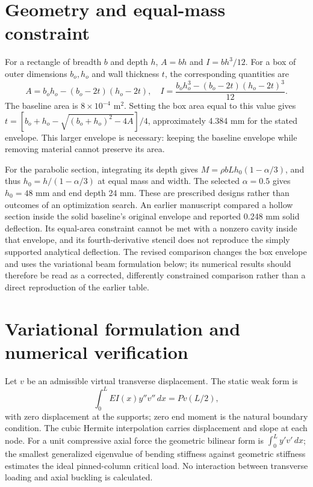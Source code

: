 \documentclass[11pt]{article}
\begin{document}
\section{Geometry and equal-mass constraint}
For a rectangle of breadth $b$ and depth $h$, $A=bh$ and $I=bh^3/12$. For a box of outer dimensions $b_o,h_o$ and wall thickness $t$, the corresponding quantities are
\begin{equation}
 A=b_oh_o-(b_o-2t)(h_o-2t),\quad I=\frac{b_oh_o^3-(b_o-2t)(h_o-2t)^3}{12}.
\end{equation}
The baseline area is $8\times10^{-4}$ m$^2$. Setting the box area equal to this value gives $t=[b_o+h_o-\sqrt{(b_o+h_o)^2-4A}]/4$, approximately 4.384 mm for the stated envelope. This larger envelope is necessary: keeping the baseline envelope while removing material cannot preserve its area.

For the parabolic section, integrating its depth gives $M=\rho bLh_0(1-\alpha/3)$, and thus $h_0=h/(1-\alpha/3)$ at equal mass and width. The selected $\alpha=0.5$ gives $h_0=48$ mm and end depth 24 mm. These are prescribed designs rather than outcomes of an optimization search. An earlier manuscript compared a hollow section inside the solid baseline's original envelope and reported 0.248 mm solid deflection. Its equal-area constraint cannot be met with a nonzero cavity inside that envelope, and its fourth-derivative stencil does not reproduce the simply supported analytical deflection. The revised comparison changes the box envelope and uses the variational beam formulation below; its numerical results should therefore be read as a corrected, differently constrained comparison rather than a direct reproduction of the earlier table.

\section{Variational formulation and numerical verification}
Let $v$ be an admissible virtual transverse displacement. The static weak form is
\begin{equation}\int_0^L EI(x)y''v''\,dx=P v(L/2),\end{equation}
with zero displacement at the supports; zero end moment is the natural boundary condition. The cubic Hermite interpolation carries displacement and slope at each node. For a unit compressive axial force the geometric bilinear form is $\int_0^L y'v'\,dx$; the smallest generalized eigenvalue of bending stiffness against geometric stiffness estimates the ideal pinned-column critical load. No interaction between transverse loading and axial buckling is calculated.
\end{document}
